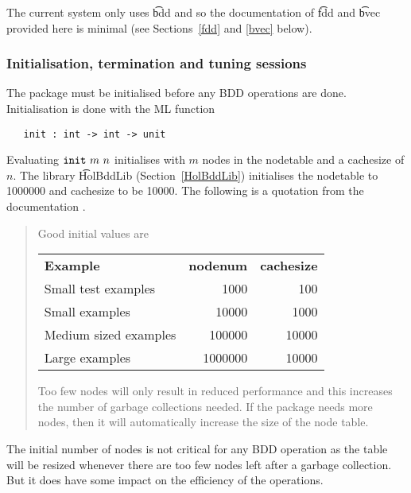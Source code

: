 The current \HolBuddy{} system only uses \t{bdd} and so
the documentation of \t{fdd} and \t{bvec} provided here is minimal
(see Sections~\ref{fdd} and \ref{bvec} below).

\subsubsection{Initialisation, termination and tuning sessions}\label{init}

The \Buddy{} package must be initialised before any BDD operations are done.
Initialisation is done with the ML function

\begin{verbatim}
   init : int -> int -> unit
\end{verbatim}

Evaluating $\mbox{\tt init}~m~n$ initialises \Buddy{} with $m$ nodes in the
nodetable and a cachesize of $n$.  
The library \t{HolBddLib} (Section~\ref{HolBddLib}) 
initialises the nodetable to 1000000 and cachesize to
be 10000. The following is a quotation from the \Buddy{} documentation \cite{BuDDy}.

\vspace*{-2mm}

{\baselineskip8pt\begin{quote}\footnotesize
Good initial values are

\smallskip

\begin{tabular}{lrr}
{\bf Example} & {\bf nodenum} & {\bf cachesize} \\
Small test examples   & 1000    & 100\\
Small examples        & 10000   & 1000 \\
Medium sized examples & 100000  & 10000\\
Large examples        & 1000000 & 10000
\end{tabular}

\smallskip

Too few nodes will only result in reduced performance and this
increases the number of garbage collections needed. If the package
needs more nodes, then it will automatically increase the size of the
node table.
\end{quote}}

The initial number of nodes is not critical for any BDD operation
as the table will be resized whenever there are too few nodes left
after a garbage collection.  But it does have some impact on the
efficiency of the operations.

